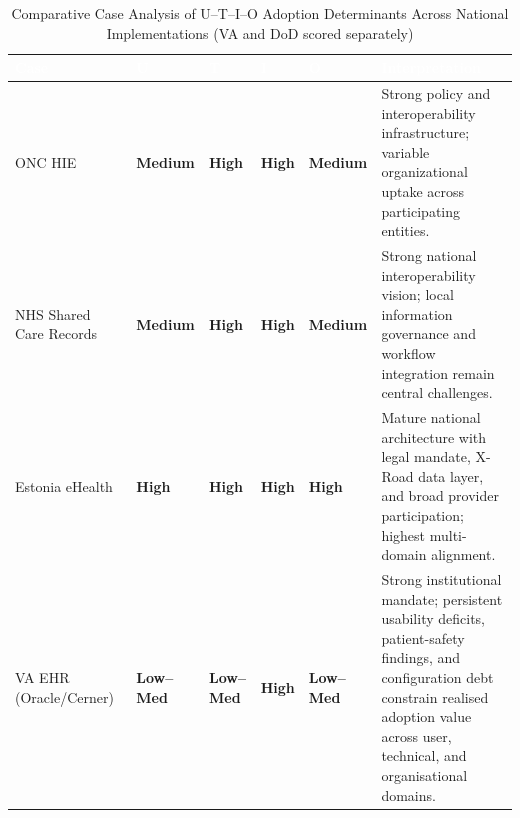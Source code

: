 \begin{table}[H]
\caption{Comparative Case Analysis of U--T--I--O Adoption Determinants Across National Implementations (VA and DoD scored separately)}
\label{tab:case-comparison}
\centering
\small
\renewcommand{\arraystretch}{1.45}
\setlength{\tabcolsep}{6pt}
\begin{tabular}{p{3.0cm} >{\centering\arraybackslash}p{1.4cm} >{\centering\arraybackslash}p{1.4cm} >{\centering\arraybackslash}p{1.4cm} >{\centering\arraybackslash}p{1.8cm} p{4.8cm}}
\toprule
\rowcolor{headerblue}
\textcolor{white}{\textbf{Case}} &
\textcolor{white}{\textbf{U}} &
\textcolor{white}{\textbf{T}} &
\textcolor{white}{\textbf{I}} &
\textcolor{white}{\textbf{O}} &
\textcolor{white}{\textbf{Interpretation}} \\
\midrule

\rowcolor{rowgray}
ONC HIE~\cite{onc2025reports} &
  \cellcolor{medamber}\textcolor{medambertext}{\textbf{Medium}} &
  \cellcolor{highgreen}\textcolor{highgreentext}{\textbf{High}} &
  \cellcolor{highgreen}\textcolor{highgreentext}{\textbf{High}} &
  \cellcolor{medamber}\textcolor{medambertext}{\textbf{Medium}} &
  Strong policy and interoperability infrastructure; variable organizational uptake across participating entities. \\

NHS Shared Care Records~\cite{nhs2025sharedcare} &
  \cellcolor{medamber}\textcolor{medambertext}{\textbf{Medium}} &
  \cellcolor{highgreen}\textcolor{highgreentext}{\textbf{High}} &
  \cellcolor{highgreen}\textcolor{highgreentext}{\textbf{High}} &
  \cellcolor{medamber}\textcolor{medambertext}{\textbf{Medium}} &
  Strong national interoperability vision; local information governance and workflow integration remain central challenges. \\

\rowcolor{rowgray}
Estonia eHealth~\cite{estonia2026ehealth} &
  \cellcolor{highgreen}\textcolor{highgreentext}{\textbf{High}} &
  \cellcolor{highgreen}\textcolor{highgreentext}{\textbf{High}} &
  \cellcolor{highgreen}\textcolor{highgreentext}{\textbf{High}} &
  \cellcolor{highgreen}\textcolor{highgreentext}{\textbf{High}} &
  Mature national architecture with legal mandate, X-Road data layer, and broad provider participation; highest multi-domain alignment. \\

VA EHR (Oracle/Cerner)~\cite{gao2025vaehr} &
  \cellcolor{lowred}\textcolor{lowredtext}{\textbf{Low--Med}} &
  \cellcolor{lowred}\textcolor{lowredtext}{\textbf{Low--Med}} &
  \cellcolor{highgreen}\textcolor{highgreentext}{\textbf{High}} &
  \cellcolor{lowred}\textcolor{lowredtext}{\textbf{Low--Med}} &
  Strong institutional mandate; persistent usability deficits, patient-safety findings, and configuration debt constrain realised adoption value across user, technical, and organisational domains. \\


\end{tabular}
\end{table}
